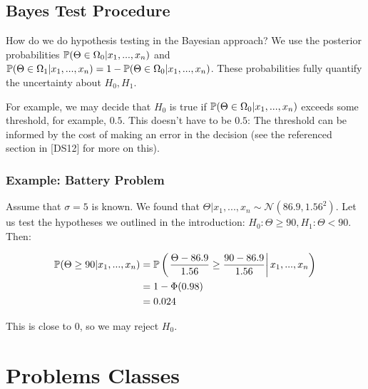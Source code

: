 \documentclass[a4paper]{article}
\begin{document}
        \subsection{Bayes Test Procedure}
            \begin{fread}
                [DS12, section 9.8]
            \end{fread}

            How do we do hypothesis testing in the Bayesian approach? We use the
            posterior probabilities $\mathbb{P}(\Theta \in \Omega_0 | x_1, ...,
            x_n)$ and $\mathbb{P}(\Theta \in \Omega_1 | x_1, ..., x_n) = 1 - \mathbb{P}
            (\Theta \in \Omega_0 | x_1, ..., x_n)$. These probabilities fully
            quantify the uncertainty about $H_0, H_1$.

            For example, we may decide that $H_0$ is true if $\mathbb{P}(\Theta \in
            \Omega_0 | x_1, ..., x_n)$ exceeds some threshold, for example,
            $0.5$. This doesn't have to be $0.5$: The threshold can be informed
            by the cost of making an error in the decision (see the referenced
            section in [DS12] for more on this).

            \subsubsection{Example: Battery Problem}
                Assume that $\sigma = 5$ is known. We found that $\Theta | x_1,
                ..., x_n \sim \mathcal{N}(86.9, 1.56^2)$. Let us test the
                hypotheses we outlined in the introduction: $H_0: \Theta \geq
                90, H_1: \Theta < 90$. Then:

                \begin{align*}
                    \mathbb{P}(\Theta \geq 90| x_1, ..., x_n) & = \mathbb{P}\left(\left.
                        \frac{\Theta - 86.9}{1.56} \geq \frac{90 - 86.9}{1.56}
                        \right| x_1, ..., x_n\right) \\
                    & = 1 - \Phi(0.98) \\
                    & = 0.024
                \end{align*}

                This is close to 0, so we may reject $H_0$.

    \newpage
    \section*{Problems Classes}
\end{document}

